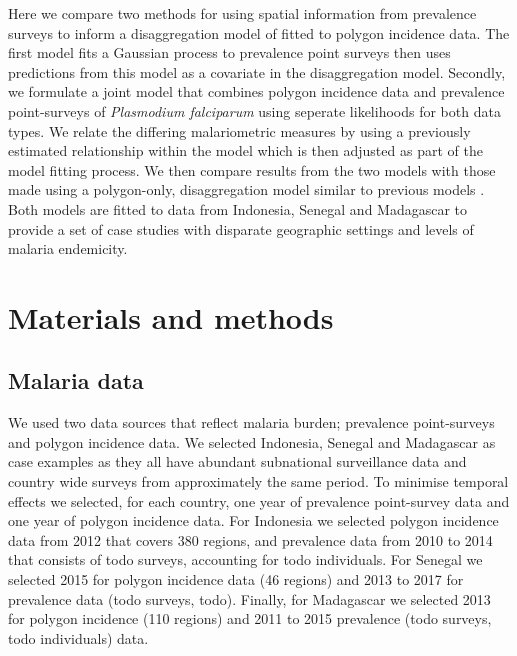 \documentclass[10pt,letterpaper]{article}
\begin{document}

Here we compare two methods for using spatial information from prevalence surveys to inform a disaggregation model of fitted to polygon incidence data.
The first model fits a Gaussian process to prevalence point surveys then uses predictions from this model as a covariate in the disaggregation model.
Secondly, we formulate a joint model that combines polygon incidence data and prevalence point-surveys of \emph{Plasmodium falciparum} using seperate likelihoods for both data types.
We relate the differing malariometric measures by using a previously estimated relationship within the model \cite{cameron2015defining} which is then adjusted as part of the model fitting process.
We then compare results from the two models with those made using a polygon-only, disaggregation model similar to previous models \cite{sturrock2014fine, wilson2017pointless}.
Both models are fitted to data from Indonesia, Senegal and Madagascar to provide a set of case studies with disparate geographic settings and levels of malaria endemicity.





\section*{Materials and methods}


\subsection*{Malaria data}

We used two data sources that reflect malaria burden; prevalence point-surveys and polygon incidence data.
We selected Indonesia, Senegal and Madagascar as case examples as they all have abundant subnational surveillance data and country wide surveys from approximately the same period.
To minimise temporal effects we selected, for each country, one year of prevalence point-survey data and one year of polygon incidence data.
For Indonesia we selected polygon incidence data from 2012 that covers 380 regions, and prevalence data from 2010 to 2014 that consists of todo surveys, accounting for todo individuals.
For Senegal we selected 2015 for polygon incidence data (46 regions) and 2013 to 2017 for prevalence data (todo surveys, todo).
Finally, for Madagascar we selected 2013 for polygon incidence (110 regions) and 2011 to 2015 prevalence (todo surveys, todo individuals) data.
\end{document}
